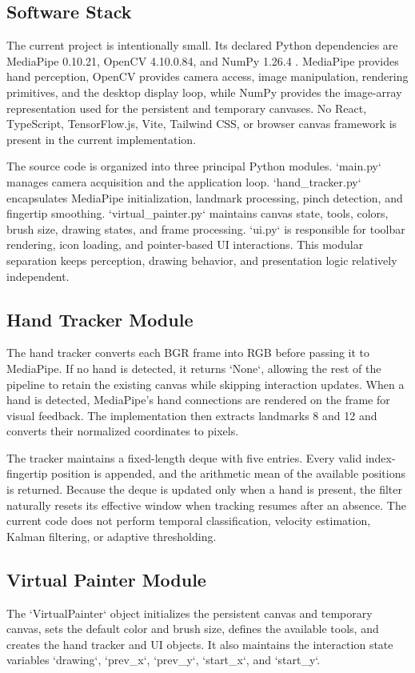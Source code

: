 \documentclass[conference]{IEEEtran}
\begin{document}
\subsection{Software Stack}
The current project is intentionally small. Its declared Python dependencies are MediaPipe 0.10.21, OpenCV 4.10.0.84, and NumPy 1.26.4 \cite{repo}. MediaPipe provides hand perception, OpenCV provides camera access, image manipulation, rendering primitives, and the desktop display loop, while NumPy provides the image-array representation used for the persistent and temporary canvases. No React, TypeScript, TensorFlow.js, Vite, Tailwind CSS, or browser canvas framework is present in the current implementation.

The source code is organized into three principal Python modules. `main.py` manages camera acquisition and the application loop. `hand\_tracker.py` encapsulates MediaPipe initialization, landmark processing, pinch detection, and fingertip smoothing. `virtual\_painter.py` maintains canvas state, tools, colors, brush size, drawing states, and frame processing. `ui.py` is responsible for toolbar rendering, icon loading, and pointer-based UI interactions. This modular separation keeps perception, drawing behavior, and presentation logic relatively independent.

\subsection{Hand Tracker Module}
The hand tracker converts each BGR frame into RGB before passing it to MediaPipe. If no hand is detected, it returns `None`, allowing the rest of the pipeline to retain the existing canvas while skipping interaction updates. When a hand is detected, MediaPipe's hand connections are rendered on the frame for visual feedback. The implementation then extracts landmarks 8 and 12 and converts their normalized coordinates to pixels.

The tracker maintains a fixed-length deque with five entries. Every valid index-fingertip position is appended, and the arithmetic mean of the available positions is returned. Because the deque is updated only when a hand is present, the filter naturally resets its effective window when tracking resumes after an absence. The current code does not perform temporal classification, velocity estimation, Kalman filtering, or adaptive thresholding.

\subsection{Virtual Painter Module}
The `VirtualPainter` object initializes the persistent canvas and temporary canvas, sets the default color and brush size, defines the available tools, and creates the hand tracker and UI objects. It also maintains the interaction state variables `drawing`, `prev\_x`, `prev\_y`, `start\_x`, and `start\_y`.
\end{document}
